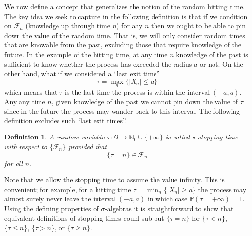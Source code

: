 \documentclass[12pt]{article}
\newcommand*{\abs}[1]{\left\lvert#1\right\rvert}
\newcommand{\Prob}{\mathbb{P}}
\newtheorem{definition}{Definition}
\begin{document}
We now define a concept that generalizes the notion of the random hitting time. The key idea we seek to capture in the following definition is that if we condition on $\mathcal{F}_n$ (knowledge up 
through time $n$) for any $n$ then we ought to be able to pin down the value of the random time. That is, we will only consider random times that are knowable from the past, excluding those that 
require knowledge of the future. In the example of the hitting time, at any time $n$ knowledge of the past is sufficient to know whether the process has exceeded the radius $a$ or not. On the other 
hand, what if we considered a ``last exit time''
\[\tau = \max_{n} \{\abs{X_n} \leq a\}\]
which means that $\tau$ is the last time the process is within the interval $(-a, a)$. Any any time $n$, given knowledge of the past we cannot pin down the value of $\tau$ since in the future the process 
may wander back to this interval. The following definition excludes such ``last exit times''. 
\begin{definition}
A random variable $\tau: \Omega \to \mathbb{N}_0 \cup \{+\infty\}$ is called a stopping time with respect to $\{\mathcal{F}_n\}$ provided that 
\[\{\tau = n\} \in \mathcal{F}_n\]
for all $n$. 
\end{definition}
Note that we allow the stopping time to assume the value infinity. This is convenient; for example, for a hitting time $\tau = \min_{n} \{\abs{X_n} \geq a\}$ the process may almost surely never 
leave the interval $(-a, a)$ in which case $\Prob(\tau = +\infty) = 1$. Using the defining properties of $\sigma$-algebras it is straightforward to show that equivalent definitions of stopping times 
could sub out $\{\tau = n\}$ for $\{\tau < n\}$, $\{\tau \leq n\}$, $\{\tau > n\}$, or $\{\tau \geq n\}$. 
\end{document}
